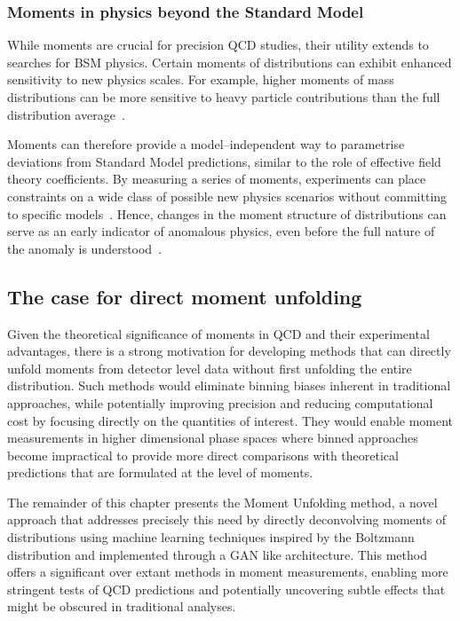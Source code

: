         \subsubsection{Moments in physics beyond the Standard Model}
            While moments are crucial for precision QCD studies, their utility extends to searches for BSM physics.
            Certain moments of distributions can exhibit enhanced sensitivity to new physics scales.
            For example, higher moments of mass distributions can be more sensitive to heavy particle contributions than the full distribution average~\cite{Buterus2023SomeDistributions, cowan_statistical_1998}.
    
            Moments can therefore provide a model--independent way to parametrise deviations from Standard Model predictions, similar to the role of effective field theory coefficients.
            By measuring a series of moments, experiments can place constraints on a wide class of possible new physics scenarios without committing to specific models~\cite{Li2022MomentsPhysics, Larkoski2020JetLearning}.
            Hence, changes in the moment structure of distributions can serve as an early indicator of anomalous physics, even before the full nature of the anomaly is understood~\cite{Li2022MomentsPhysics, Metodiev2024AnomalyObservables, Romao2021FindingColliders}.

    \subsection{The case for direct moment unfolding}
        Given the theoretical significance of moments in QCD and their experimental advantages, there is a strong motivation for developing methods that can directly unfold moments from detector level data without first unfolding the entire distribution.
        Such methods would eliminate binning biases inherent in traditional approaches, while potentially improving precision and reducing computational cost by focusing directly on the quantities of interest.
        They would enable moment measurements in higher dimensional phase spaces where binned approaches become impractical to provide more direct comparisons with theoretical predictions that are formulated at the level of moments.

        The remainder of this chapter presents the Moment Unfolding method, a novel approach that addresses precisely this need by directly deconvolving moments of distributions using machine learning techniques inspired by the Boltzmann distribution and implemented through a GAN like architecture.
        This method offers a significant over extant methods in moment measurements, enabling more stringent tests of QCD predictions and potentially uncovering subtle effects that might be obscured in traditional analyses.
